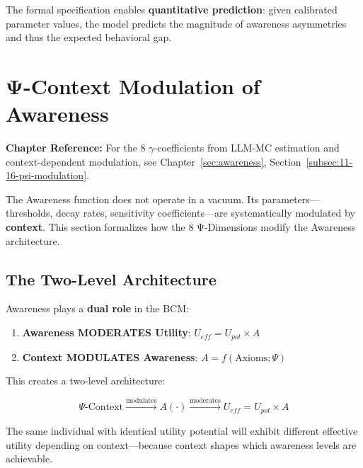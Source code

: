 The formal specification enables \textbf{quantitative prediction}: given calibrated parameter values, the model predicts the magnitude of awareness asymmetries and thus the expected behavioral gap.




\section{Ψ-Context Modulation of Awareness}
\label{sec:psi-modulation}

\begin{cross-reference}
\textbf{Chapter Reference:} For the 8 $\gamma$-coefficients from LLM-MC estimation 
and context-dependent modulation, see Chapter~\ref{sec:awareness}, 
Section~\ref{subsec:11-16-psi-modulation}.
\end{cross-reference}

The Awareness function does not operate in a vacuum. Its parameters---thresholds, decay rates, sensitivity coefficients---are systematically modulated by \textbf{context}. This section formalizes how the 8 Ψ-Dimensions modify the Awareness architecture.

\subsection{The Two-Level Architecture}

Awareness plays a \textbf{dual role} in the BCM:

\begin{enumerate}
    \item \textbf{Awareness MODERATES Utility}: $U_{eff} = U_{pot} \times A$
    \item \textbf{Context MODULATES Awareness}: $A = f(\text{Axioms}; \Psi)$
\end{enumerate}

This creates a two-level architecture:

\begin{equation}
\boxed{
\Psi\text{-Context} \xrightarrow{\text{modulates}} A(\cdot) \xrightarrow{\text{moderates}} U_{eff} = U_{pot} \times A
}
\end{equation}

The same individual with identical utility potential will exhibit different effective utility depending on context---because context shapes which awareness levels are achievable.

